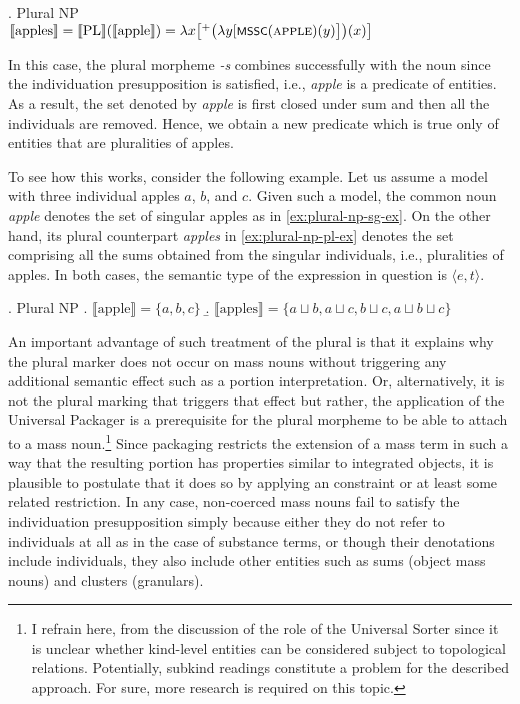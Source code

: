 	\ex. Plural NP\label{ex:plural-np}\\
	$\llbracket \text{apples}\rrbracket = \llbracket \text{PL}\rrbracket (\llbracket\text{apple}\rrbracket) = \lambda x\big[{}^+\big(\lambda y[\cnst{mssc}(\textsc{apple})(y)\big]\big)(x)\big]$
	
	In this case, the plural morpheme \textit{-s} combines successfully with the noun since the individuation presupposition is satisfied, i.e., \textit{apple} is a predicate of  entities. As a result, the set denoted by \textit{apple} is first closed under sum and then all the  individuals are removed. Hence, we obtain a new predicate which is true only of entities that are pluralities of apples.
	
	To see how this works, consider the following example. Let us assume a model with three individual apples $a$, $b$, and $c$. Given such a model, the common noun \textit{apple} denotes the set of singular apples as in \ref{ex:plural-np-sg-ex}. On the other hand, its plural counterpart \textit{apples} in \ref{ex:plural-np-pl-ex} denotes the set comprising all the sums obtained from the singular individuals, i.e., pluralities of apples. In both cases, the semantic type of the expression in question is $\langle e,t\rangle$.
	
	\ex. Plural NP\label{ex:plural-np-ex}
	\a. $\llbracket \text{apple}\rrbracket = \{a,b,c\}$\label{ex:plural-np-sg-ex}
	\b. $\llbracket \text{apples}\rrbracket = \{a\sqcup b, a\sqcup c, b\sqcup c, a\sqcup b\sqcup c\}$\label{ex:plural-np-pl-ex}
	
	An important advantage of such treatment of the plural is that it explains why the plural marker does not occur on mass nouns without triggering any additional semantic effect such as a portion interpretation. Or, alternatively, it is not the plural marking that triggers that effect but rather, the application of the Universal Packager is a prerequisite for the plural morpheme to be able to attach to a mass noun.\footnote{I refrain here, from the discussion of the role of the Universal Sorter since it is unclear whether kind-level entities can be considered subject to topological relations. Potentially, subkind readings constitute a problem for the described approach. For sure, more research is required on this topic.} Since packaging restricts the extension of a mass term in such a way that the resulting portion has properties similar to integrated objects, it is plausible to postulate that it does so by applying an  constraint or at least some related restriction. In any case, non-coerced mass nouns fail to satisfy the individuation presupposition simply because either they do not refer to  individuals at all as in the case of substance terms, or though their denotations include  individuals, they also include other entities such as sums (object mass nouns) and clusters (granulars).
	
